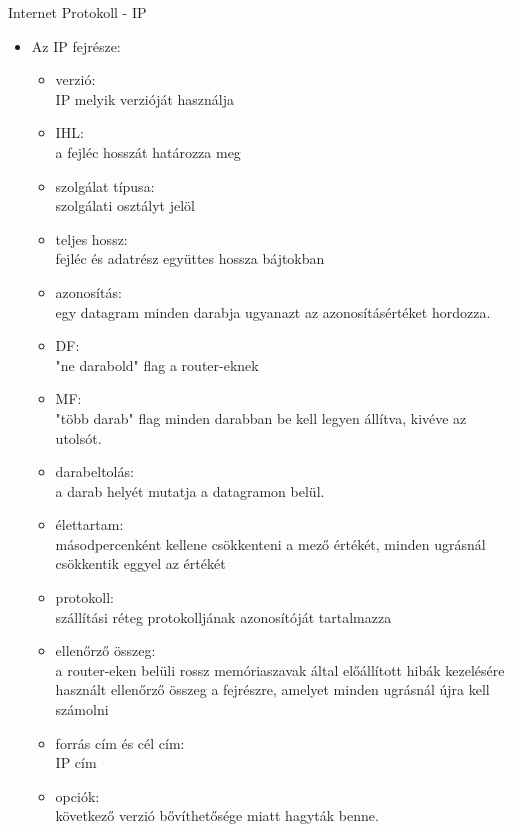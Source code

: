 \documentclass[margin=0px]{article}
\begin{document}
\begin{description}
        Internet Protokoll - IP
        \begin{itemize}
            \item Az IP fejrésze:
                  \begin{itemize}
                      \item verzió:\\
                            IP melyik verzióját használja
                      \item IHL: \\
                            a fejléc hosszát határozza meg
                      \item szolgálat típusa: \\
                            szolgálati osztályt jelöl
                      \item teljes hossz: \\
                            fejléc és adatrész együttes hossza bájtokban
                      \item azonosítás: \\
                            egy datagram minden darabja ugyanazt az azonosításértéket hordozza.
                      \item DF: \\
                            "ne darabold" flag a router-eknek
                      \item MF: \\
                            "több darab" flag minden darabban be kell legyen állítva, kivéve az utolsót.
                      \item darabeltolás: \\
                            a darab helyét mutatja a datagramon belül.
                      \item élettartam: \\
                            másodpercenként kellene csökkenteni a mező értékét, minden ugrásnál csökkentik eggyel az értékét
                      \item protokoll: \\
                            szállítási réteg protokolljának azonosítóját tartalmazza
                      \item ellenőrző összeg: \\
                            a router-eken belüli rossz memóriaszavak által előállított hibák kezelésére használt ellenőrző összeg a fejrészre, amelyet minden ugrásnál újra kell számolni
                      \item forrás cím és cél cím: \\
                            IP cím
                      \item opciók: \\
                            következő verzió bővíthetősége miatt hagyták benne.
                  \end{itemize}


\end{itemize}
\end{description}
\end{document}
